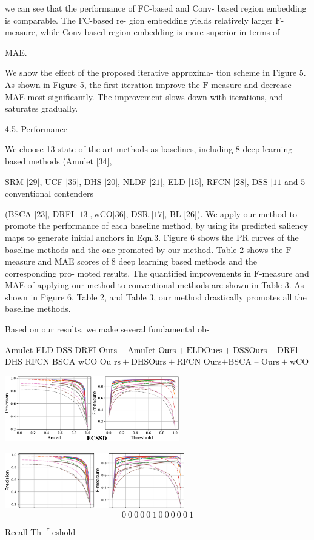 \documentclass[a4paper,10pt]{article}
\begin{document}
we can see that the performance of FC-based and Conv- based region embedding is comparable. The FC-based re- gion embedding yields relatively larger $\mathrm{F}$-measure, while Conv-based region embedding is more superior in terms of

MAE.

We show the effect of the proposed iterative approxima- tion scheme in Figure 5. As shown in Figure 5, the first iteration improve the $\mathrm{F}$-measure and decrease MAE most significantly. The improvement slows down with iterations, and saturates gradually.

4.5. Performance

We choose 13 state-of-the-art methods as baselines, including 8 deep learning based methods (Amulet [34],

SRM $|29|$, UCF $|35|$, DHS $|20|$, NLDF $|21|$, ELD [15], RFCN $|28|$, DSS $|11$ and 5 conventional contenders

(BSCA $|23|$, DRFI $|13|, \mathrm{w}\mathrm{C}\mathrm{O}|36|$, DSR $|17|$, BL [26]). We apply our method to promote the performance of each baseline method, by using its predicted saliency maps to generate initial anchors in Eqn.3. Figure 6 shows the PR curves of the baseline methods and the one promoted by our method. Table 2 shows the $\mathrm{F}$-measure and MAE scores of 8 deep learning based methods and the corresponding pro- moted results. The quantified improvements in $\mathrm{F}$-measure and MAE of applying our method to conventional methods are shown in Table 3. As shown in Figure 6, Table 2, and Table 3, our method drastically promotes all the baseline methods.

Based on our results, we make several fundamental ob-

AmuIet ELD DSS DRFI $\mathrm{O}\mathrm{u}\mathrm{r}\mathrm{s}+$AmuIet $\mathrm{O}\mathfrak{u}\mathrm{r}\mathrm{s}+\mathrm{E}\mathrm{L}\mathrm{D} \mathrm{O}\mathrm{u}r\mathrm{s}+\mathrm{D}\mathrm{S}\mathrm{S} \mathrm{O}\mathrm{u}\mathrm{r}\mathrm{s}+$DRFl DHS RFCN BSCA wCO Ou $\mathrm{r}\mathrm{s}+\mathrm{D}\mathrm{H}\mathrm{S} \mathrm{O}\mathfrak{u}\mathrm{r}\mathrm{s}+$RFCN Ours$+$BSCA -- $\mathrm{O}\mathrm{u}\mathrm{r}\mathrm{s}+\mathrm{w}\mathrm{C}\mathrm{O}$
\begin{center}
\includegraphics[width=75.86mm,height=28.45mm]{./zengyu_images/image011.eps}

\includegraphics[width=78.23mm,height=24.51mm]{./zengyu_images/image012.eps}
$$
0\ 0\ 0\ 0\ 0\ 1\ 0\ 0\ 0\ 0\ 0\ 1
$$
\end{center}
Recall Th $\ulcorner$eshold
\end{document}
